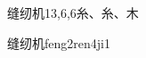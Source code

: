 \begin{entry}{缝纫机}{13,6,6}{⽷、⽷、⽊}
  \begin{phonetics}{缝纫机}{feng2ren4ji1}
  \end{phonetics}
\end{entry}
